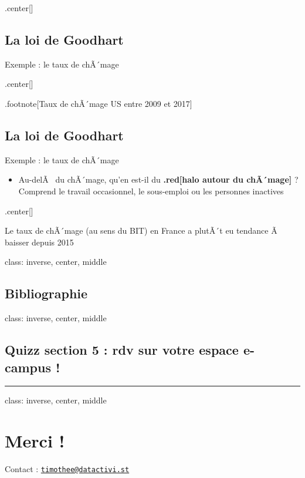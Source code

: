 \documentclass[]{article}
\providecommand{\tightlist}{%
  \setlength{\itemsep}{0pt}\setlength{\parskip}{0pt}}
\begin{document}
.center{[}{]}

\subsection{La loi de Goodhart}\label{la-loi-de-goodhart-3}

Exemple : le taux de chÃ´mage

.center{[}{]}

.footnote{[}Taux de chÃ´mage US entre 2009 et 2017{]}

\subsection{La loi de Goodhart}\label{la-loi-de-goodhart-4}

Exemple : le taux de chÃ´mage

\begin{itemize}
\tightlist
\item
  Au-delÃ~ du chÃ´mage, qu'en est-il du \textbf{.red{[}halo autour du
  chÃ´mage{]}} ? Comprend le travail occasionnel, le sous-emploi ou les
  personnes inactives
\end{itemize}

.center{[}{]}

Le taux de chÃ´mage (au sens du BIT) en France a plutÃ´t eu tendance Ã~
baisser depuis 2015

class: inverse, center, middle

\subsection{Bibliographie}\label{bibliographie}

class: inverse, center, middle

\subsection{Quizz section 5 : rdv sur votre espace e-campus
!}\label{quizz-section-5-rdv-sur-votre-espace-e-campus}

\begin{center}\rule{0.5\linewidth}{\linethickness}\end{center}

class: inverse, center, middle

\section{Merci !}\label{merci}

Contact :
\href{mailto:timothee@datactivi.st}{\nolinkurl{timothee@datactivi.st}}
\end{document}
